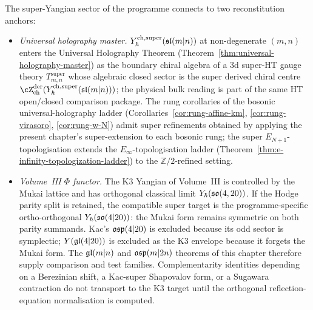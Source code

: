 \begin{remark}
\label{rem:super-climax-anchors}
The super-Yangian sector of the programme connects to two
reconstitution anchors:
\begin{itemize}
\item[(a)] \emph{Universal holography master.}
 $Y^{\mathrm{ch},\mathrm{super}}_{\hbar}(\mathfrak{sl}(m|n))$ at non-degenerate $(m,n)$ enters the
 Universal Holography Theorem
 (Theorem~\ref{thm:universal-holography-master}) as the boundary
 chiral algebra of a 3d super-HT gauge theory
 $T^{\mathrm{super}}_{m,n}$ whose algebraic closed sector is the
 super derived chiral centre
 $\cZ^{\mathrm{der}}_{\mathrm{ch}}(\Ysuper_{\hbar}(\fsl(m|n)))$;
 the physical bulk reading is part of the same HT open/closed
 comparison package.
 The rung corollaries of the bosonic universal-holography ladder
 (Corollaries~\ref{cor:rung-affine-km}, \ref{cor:rung-virasoro},
 \ref{cor:rung-w-N}) admit super refinements obtained by applying the
 present chapter's super-extension to each bosonic rung; the super
 $E_{N+1}$-topologisation extends the $E_\infty$-topologisation
 ladder (Theorem~\ref{thm:e-infinity-topologization-ladder}) to the
 $\mathbb{Z}/2$-refined setting.
\item[(b)] \emph{Volume~III $\Phi$ functor.} The K3 Yangian of
 Volume~III is controlled by the Mukai lattice and has orthogonal
 classical limit $Y_{\hbar}(\mathfrak{so}(4,20))$. If the Hodge parity split is
 retained, the compatible super target is the programme-specific
 ortho-orthogonal $Y_{\hbar}(\mathfrak{so}(4|20))$: the Mukai form remains
 symmetric on both parity summands. Kac's $\mathfrak{osp}(4|20)$ is excluded
 because its odd sector is symplectic; $Y(\mathfrak{gl}(4|20))$ is excluded as
 the K3 envelope because it forgets the Mukai form. The
 $\mathfrak{gl}(m|n)$ and $\mathfrak{osp}(m|2n)$ theorems of this chapter therefore
 supply comparison and test families. Complementarity identities
 depending on a Berezinian shift, a Kac-super Shapovalov form, or a
 Sugawara contraction do not transport to the K3 target until the
 orthogonal reflection-equation normalisation is computed.
\end{itemize}
\end{remark}

